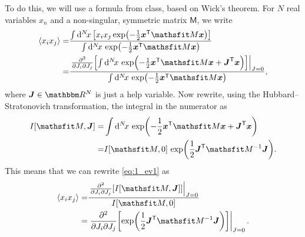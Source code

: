 \documentclass[11pt,letter, swedish, english
]{article}
\begin{document}
To do this, we will use a formula from class, based on Wick's
theorem. For $N$ real variables $x_n$ and a non-singular, symmetric
matrix $\mathsf{M}$, we write
\begin{equation}\label{eq:1_ev1}
\begin{aligned}
\ev{x_{i}x_{j}} =& 
\frac{\int\rd^N\!x\,\qty[x_{i}x_{j}
\exp(-\frac{1}{2}\vb*x^\mathsfrm{T}\mathsf{M}\vb*x)]}
{\int\rd^N\!x\, \exp(-\frac{1}{2}\vb*x^\mathsfrm{T}\mathsf{M}\vb*x)}\\
=&\frac{\eval{\pdv[2]{}{J_i}{J_j}
\qty[\int\rd^N\!x\, 
\exp(-\frac{1}{2}\vb*x^\mathsfrm{T}\mathsf{M}\vb*x
+\vb*J^\mathsfrm{T}\vb*x)]}_{J=0}}
{\int\rd^N\!x\, \exp(-\frac{1}{2}\vb*x^\mathsfrm{T}\mathsf{M}\vb*x)},
\end{aligned}
\end{equation}
where $\vb*J\in\R^N$ is just a help variable. Now rewrite, using the
Hubbard–Stratonovich transformation, the integral in the numerator as
\begin{equation}
\begin{aligned}
I[\mathsf{M}, \vb*J] =& \int\rd^N\!x\, 
\exp(-\frac{1}{2}\vb*x^\mathsfrm{T}\mathsf{M}\vb*x
+\vb*J^\mathsfrm{T}\vb*x) \\
=& I[\mathsf{M}, 0]\,\exp(\frac{1}{2}\vb*J^\mathsfrm{T}\mathsf{M}^{-1}\vb*J).
\end{aligned}
\end{equation}
This means that we can rewrite \eqref{eq:1_ev1} as
\begin{equation}\label{eq:1_ev2}
\begin{aligned}
\ev{x_{i}x_{j}} =&
\frac{\eval{\pdv[2]{}{J_i}{J_j}
\qty[I[\mathsf{M}, \vb*J]]}_{J=0}}
{I[\mathsf{M}, 0]}\\
=&\eval{\pdv[2]{}{J_i}{J_j}
\qty[\exp(\frac{1}{2}\vb*J^\mathsfrm{T}\mathsf{M}^{-1}\vb*J)]}_{J=0}.
\end{aligned}
\end{equation}
\end{document}
